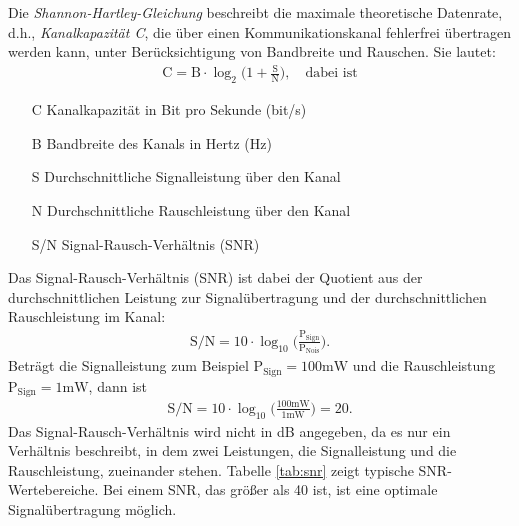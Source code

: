 \documentclass{scrartcl}
\numberwithin{equation}{section}
\begin{document}
Die \textit{Shannon-Hartley-Gleichung} beschreibt die maximale theoretische Datenrate, d.h., \textit{Kanalkapazität C}, die über einen Kommunikationskanal fehlerfrei übertragen werden kann, unter Berücksichtigung von Bandbreite und Rauschen. Sie lautet:
\begin{align*}
	\text{C} = \text{B} \cdot \log_2{\bigg(1+\frac{\text{S}}{\text{N}}\bigg)}, \quad \text{dabei ist}
\end{align*}
\begin{enumerate}
	\item[C] Kanalkapazität in Bit pro Sekunde (bit/s)
	\item[B] Bandbreite des Kanals in Hertz (Hz)
	\item[S] Durchschnittliche Signalleistung über den Kanal
	\item[N] Durchschnittliche Rauschleistung über den Kanal
	\item[S/N] Signal-Rausch-Verhältnis (SNR)
\end{enumerate}
Das Signal-Rausch-Verhältnis (SNR) ist dabei der Quotient aus der durchschnittlichen Leistung zur Signalübertragung und der durchschnittlichen Rauschleistung im Kanal:
\begin{align*}
	\text{S}/\text{N} = 10 \cdot \log_{10} \bigg(\frac{\text{P}_{\text{Sign}}}{\text{P}_{\text{Nois}}}\bigg).
\end{align*}
Beträgt die Signalleistung zum Beispiel $\text{P}_{\text{Sign}} = 100\text{mW}$ und die Rauschleistung $\text{P}_{\text{Sign}} = 1\text{mW}$, dann ist 
\begin{align*}
	\text{S}/\text{N} = 10 \cdot \log_{10} \bigg(\frac{100\text{mW}}{1{\text{mW}}}\bigg) = 20.
\end{align*}
Das Signal-Rausch-Verhältnis wird nicht in dB angegeben, da es nur ein Verhältnis beschreibt, in dem zwei Leistungen, die Signalleistung und die Rauschleistung, zueinander stehen. Tabelle \ref{tab:snr} zeigt typische SNR-Wertebereiche. Bei einem SNR, das größer als 40 ist, ist eine optimale Signalübertragung möglich.
\end{document}
